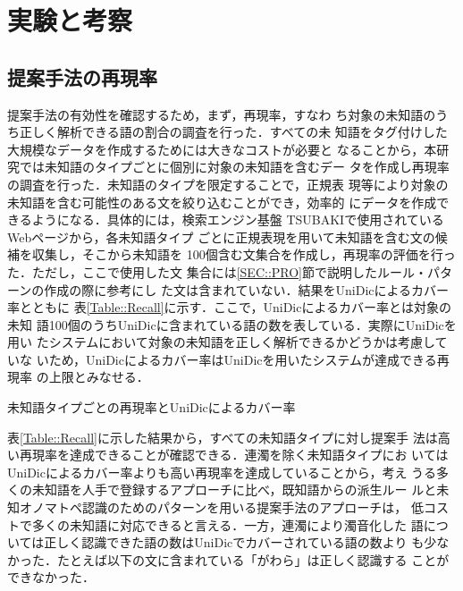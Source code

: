 \documentclass[japanese]{jnlp_1.4}
\begin{document}
 \section{実験と考察}
 
  \subsection{提案手法の再現率}
\label{SEC::RECALL}

提案手法の有効性を確認するため，まず，再現率，すなわ
  ち対象の未知語のうち正しく解析できる語の割合の調査を行った．すべての未
  知語をタグ付けした大規模なデータを作成するためには大きなコストが必要と
  なることから，本研究では未知語のタイプごとに個別に対象の未知語を含むデー
  タを作成し再現率の調査を行った．未知語のタイプを限定することで，正規表
  現等により対象の未知語を含む可能性のある文を絞り込むことができ，効率的
  にデータを作成できるようになる．具体的には，検索エンジン基盤
  TSUBAKI\cite{Shinzato2008}で使用されているWebページから，各未知語タイプ
  ごとに正規表現を用いて未知語を含む文の候補を収集し，そこから未知語を
  100個含む文集合を作成し，再現率の評価を行った．ただし，ここで使用した文
  集合には\ref{SEC::PRO}節で説明したルール・パターンの作成の際に参考にし
  た文は含まれていない．結果をUniDic\cite{Den2007}によるカバー率とともに
  表\ref{Table::Recall}に示す．ここで，UniDicによるカバー率とは対象の未知
  語100個のうちUniDicに含まれている語の数を表している．実際にUniDicを用い
  たシステムにおいて対象の未知語を正しく解析できるかどうかは考慮していな
  いため，UniDicによるカバー率はUniDicを用いたシステムが達成できる再現率
  の上限とみなせる．
  
  \begin{table}[b]
   \caption{未知語タイプごとの再現率とUniDicによるカバー率}
   \label{Table::Recall}

  \end{table}  

  表\ref{Table::Recall}に示した結果から，すべての未知語タイプに対し提案手
  法は高い再現率を達成できることが確認できる．連濁を除く未知語タイプにお
  いてはUniDicによるカバー率よりも高い再現率を達成していることから，考え
  うる多くの未知語を人手で登録するアプローチに比べ，既知語からの派生ルー
  ルと未知オノマトペ認識のためのパターンを用いる提案手法のアプローチは，
  低コストで多くの未知語に対応できると言える．一方，連濁により濁音化した
  語については正しく認識できた語の数はUniDicでカバーされている語の数より
  も少なかった．たとえば以下の文に含まれている「がわら」は正しく認識する
  ことができなかった．

\begin{exe}
\end{exe}
  
\end{document}
